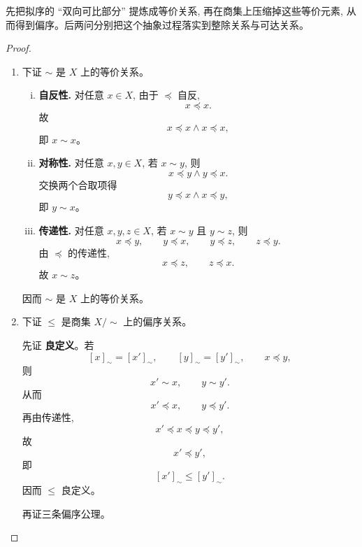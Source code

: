 \begin{remark}
	先把拟序的 ``双向可比部分'' 提炼成等价关系, 再在商集上压缩掉这些等价元素, 从而得到偏序。后两问分别把这个抽象过程落实到整除关系与可达关系。
\end{remark}

\begin{proof}
  \begin{enumerate}[(1)]
    \item 下证 $\sim$ 是 $X$ 上的等价关系。

      \begin{enumerate}[(i)]
        \item \textbf{自反性.} 对任意 $x \in X$, 由于 $\preceq$ 自反,
          \[
            x \preceq x.
          \]
          故
          \[
            x \preceq x \land x \preceq x,
          \]
          即 $x \sim x$。

        \item \textbf{对称性.} 对任意 $x, y \in X$, 若 $x \sim y$, 则
          \[
            x \preceq y \land y \preceq x.
          \]
          交换两个合取项得
          \[
            y \preceq x \land x \preceq y,
          \]
          即 $y \sim x$。

        \item \textbf{传递性.} 对任意 $x, y, z \in X$, 若 $x \sim y$ 且 $y \sim z$, 则
          \[
            x \preceq y, \qquad y \preceq x,
            \qquad y \preceq z, \qquad z \preceq y.
          \]
          由 $\preceq$ 的传递性,
          \[
            x \preceq z,
            \qquad
            z \preceq x.
          \]
          故 $x \sim z$。
      \end{enumerate}

      因而 $\sim$ 是 $X$ 上的等价关系。

    \item 下证 $\le$ 是商集 $X/\sim$ 上的偏序关系。

      先证 \textbf{良定义}。若
      \[
        [x]_{\sim} = [x']_{\sim},
        \qquad
        [y]_{\sim} = [y']_{\sim},
        \qquad
        x \preceq y,
      \]
      则
      \[
        x' \sim x,
        \qquad
        y \sim y'.
      \]
      从而
      \[
        x' \preceq x,
        \qquad
        y \preceq y'.
      \]
      再由传递性,
      \[
        x' \preceq x \preceq y \preceq y',
      \]
      故
      \[
        x' \preceq y',
      \]
      即
      \[
        [x']_{\sim} \le [y']_{\sim}.
      \]
      因而 $\le$ 良定义。

      再证三条偏序公理。


\end{enumerate}
\end{proof}

